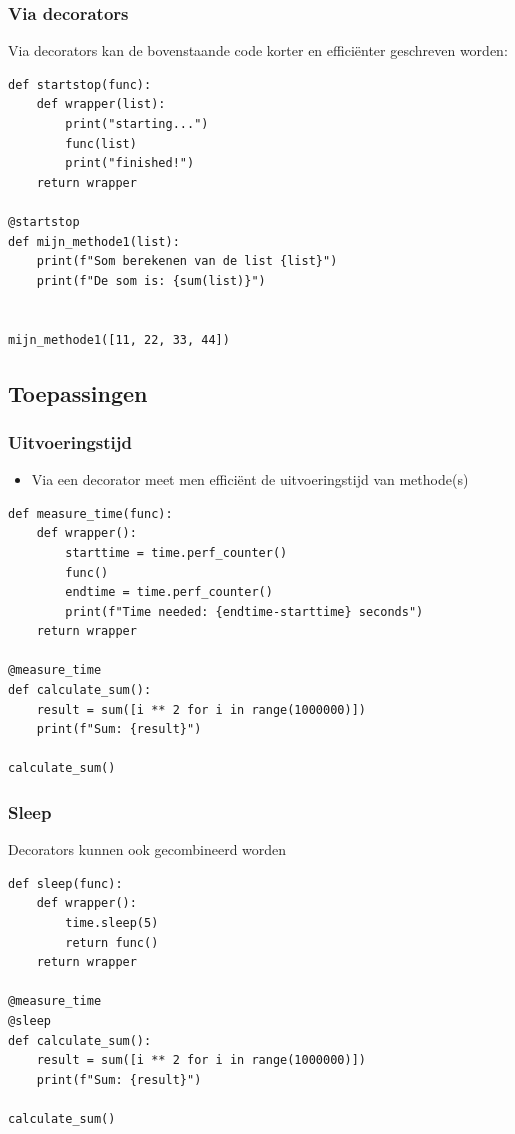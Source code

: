 \documentclass{article}
\begin{document}
\subsubsection{Via decorators}

Via decorators kan de bovenstaande code korter en efficiënter geschreven worden:

\begin{verbatim}
def startstop(func):
    def wrapper(list):
        print("starting...")
        func(list)
        print("finished!")
    return wrapper

@startstop
def mijn_methode1(list):
    print(f"Som berekenen van de list {list}")
    print(f"De som is: {sum(list)}")


mijn_methode1([11, 22, 33, 44])
\end{verbatim}

\subsection{Toepassingen}


\subsubsection{Uitvoeringstijd}

\begin{itemize}
    \item Via een decorator meet men efficiënt de uitvoeringstijd van methode(s)
\end{itemize}

\begin{verbatim}
def measure_time(func):
    def wrapper():
        starttime = time.perf_counter()
        func()
        endtime = time.perf_counter()
        print(f"Time needed: {endtime-starttime} seconds")
    return wrapper

@measure_time
def calculate_sum():
    result = sum([i ** 2 for i in range(1000000)])
    print(f"Sum: {result}")

calculate_sum()
\end{verbatim}

\subsubsection{Sleep}

Decorators kunnen ook gecombineerd worden

\begin{verbatim}
def sleep(func):
    def wrapper():
        time.sleep(5)
        return func()
    return wrapper

@measure_time
@sleep
def calculate_sum():
    result = sum([i ** 2 for i in range(1000000)])
    print(f"Sum: {result}")

calculate_sum()
\end{verbatim}
\end{document}
